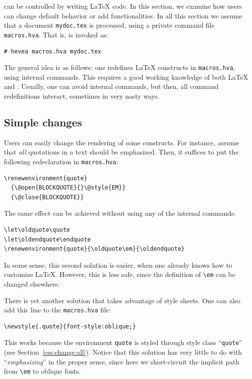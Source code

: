 \hevea{} can be controlled by writing \LaTeX{} code. In this section,
we examine how users can change \hevea{} default behavior or add
functionalities. In all this section we assume that a document
\texttt{mydoc.tex} is processed, using a private command file
\texttt{macros.hva}. That is, \hevea{} is invoked as:
\begin{verbatim}
# hevea macros.hva mydoc.tex
\end{verbatim}
The general idea is as follows: one redefines \LaTeX{} constructs in
\texttt{macros.hva}, using internal commands. This requires a good
working knowledge of both \LaTeX{} and \html.
Usually, one can avoid internal commands, but then, all command
redefinitions interact, sometimes in very nasty ways.


\subsection{Simple changes}
Users can easily change the rendering of some constructs. For
instance, assume that \emph{all} quotations in a text should be
emphasized. Then, it suffices to put the following redeclaration in
\texttt{macros.hva}:
\begin{verbatim}
\renewenvironment{quote}
  {\@open{BLOCKQUOTE}{}\@style{EM}}
  {\@close{BLOCKQUOTE}}
\end{verbatim}

The same effect can be achieved without using any of the internal
commands:
\begin{verbatim}
\let\oldquote\quote
\let\oldendquote\endquote
\renewenvironment{quote}{\oldquote\em}{\oldendquote}
\end{verbatim}
In some sense, this second 
solution is easier, when one already knows
how to customize \LaTeX{}. However, this is less safe, since the definition of
\verb+\em+ can be changed elsewhere.

There is yet another solution that takes advantage of style sheets.
One can also add this line to the \texttt{macros.hva} file:
\begin{verbatim}
\newstyle{.quote}{font-style:oblique;}
\end{verbatim}
This works because the environment \texttt{quote} is styled through
style class ``\texttt{quote}'' (see Section~\ref{css:change:all}).
Notice that this solution has very little to do with
``\emph{emphasizing}'' in the proper sense, since here we
short-circuit the implicit path from \verb+\em+ to oblique fonts.


